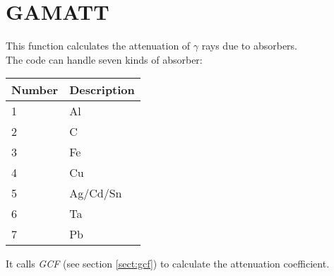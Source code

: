 \section{GAMATT}
\label{sect:gamatt}

\noindent This function calculates the attenuation of $\gamma$ rays due to
absorbers.\\

\noindent The code can handle seven kinds of absorber:\\

\begin{center}
\begin{tabular}{|ll|}
\hline
Number & Description\\
\hline
1 & Al\\
2 & C\\
3 & Fe\\
4 & Cu\\
5 & Ag/Cd/Sn\\
6 & Ta\\
7 & Pb\\
\hline
\end{tabular}
\end{center}

\noindent It calls {\em GCF} (see section \ref{sect:gcf}) to calculate the
attenuation coefficient.\\

